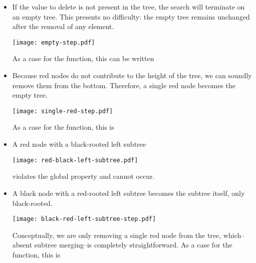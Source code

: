 \documentclass[preprint]{sigplanconf}
\begin{document}
\begin{itemize}

\item If the value to delete is not present in the tree, the search will terminate on an empty tree. This presents no difficulty: the empty tree remains unchanged after the removal of any element.
\begin{center}
\texttt{[image: empty-step.pdf]}
\end{center}
As a case for the  function, this can be written
\begin{schemedisplay}
[(L) (L)]
\end{schemedisplay}

\item Because red nodes do not contribute to the height of the tree, we can soundly remove them from the bottom. Therefore, a single red node becomes the empty tree.
\begin{center}
\texttt{[image: single-red-step.pdf]}
\end{center}
As a case for the  function, this is
\begin{schemedisplay}
[(R (L) (== v) (L)) (L)]
\end{schemedisplay}

\item A red node with a black-rooted left subtree
\begin{center}
\texttt{[image: red-black-left-subtree.pdf]}
\end{center}
violates the global property and cannot occur.

\item A black node with a red-rooted left subtree becomes the subtree itself, only black-rooted.
\begin{center}
\texttt{[image: black-red-left-subtree-step.pdf]}
\end{center}
Conceptually, we are only removing a single red node from the tree, which--absent subtree merging--is completely straightforward. As a case for the  function, this is
\begin{schemedisplay}
[(B (R a x b) (== v) (L)) (B a x b)]
\end{schemedisplay}


\end{itemize}
\end{document}
